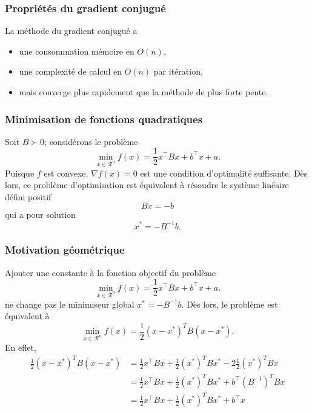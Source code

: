 \documentclass[usepdftitle=false,aspectratio=169]{beamer}
\def\cR{\mathcal{R}}
\begin{document}
\begin{frame}
\frametitle{Propriétés du gradient conjugué}

La méthode du gradient conjugué a
\begin{itemize}
\item
une consommation mémoire en $O(n)$,
\item
une complexité de calcul en $O(n)$ par itération,
\item
mais converge plus rapidement que la méthode de plus forte pente.
\end{itemize}

\end{frame}

\begin{frame}
\frametitle{Minimisation de fonctions quadratiques}

Soit $B \succ 0$; considérons le problème
$$
\min_{x \in \cR^n} f(x) = \frac{1}{2}x^\top Bx + b^\top x + a.
$$
Puisque $f$ est convexe, $\nabla f(x) = 0$ est une condition d'optimalité suffisante.
Dès lors, ce problème d'optimisation est équivalent à résoudre le système linéaire défini positif
$$
Bx = -b
$$
qui a pour solution
$$
x^* = - B^{-1}b.
$$

\end{frame}

\begin{frame}
\frametitle{Motivation géométrique}

Ajouter une constante à la fonction objectif du problème
$$
\min_{x \in \cR^n} f(x) = \frac{1}{2}x^\top Bx + b^\top x + a.
$$
ne change pas le minimiseur global $x^* = - B^{-1}b$.
Dès lors, le problème est équivalent à
$$
\min_{x \in \cR^n} f(x) = \frac{1}{2}(x-x^*)^TB(x-x^*).
$$
En effet,
\begin{align*}
\frac{1}{2}(x-x^*)^TB(x-x^*) &= \frac{1}{2}x^\top B x + \frac{1}{2}(x^*)^T B x^* -2\frac{1}{2} (x^*)^T B x \\
& = \frac{1}{2}x^\top B x + \frac{1}{2}(x^*)^T B x^* + b^\top (B^{-1})^T B x \\
& = \frac{1}{2}x^\top B x + \frac{1}{2}(x^*)^T B x^* + b^\top x \\
\end{align*}

\end{frame}
\end{document}
